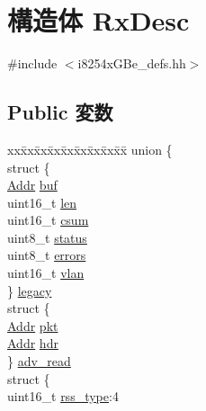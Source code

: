 \hypertarget{structiGbReg_1_1RxDesc}{
\section{構造体 RxDesc}
\label{structiGbReg_1_1RxDesc}
}


{\ttfamily \#include $<$i8254xGBe\_\-defs.hh$>$}\subsection*{Public 変数}
\begin{DoxyCompactItemize}
\item 
\begin{tabbing}
xx\=xx\=xx\=xx\=xx\=xx\=xx\=xx\=xx\=\kill
union \{\\
\>struct \{\\
\>\>\hyperlink{base_2types_8hh_af1bb03d6a4ee096394a6749f0a169232}{Addr} \hyperlink{structiGbReg_1_1RxDesc_ab07731c39d91dce80991730e3c50eba0}{buf}\\
\>\>uint16\_t \hyperlink{structiGbReg_1_1RxDesc_a8aed22e2c7b283705ec82e0120515618}{len}\\
\>\>uint16\_t \hyperlink{structiGbReg_1_1RxDesc_a70c414cecc404579f50124a9cebc66e9}{csum}\\
\>\>uint8\_t \hyperlink{structiGbReg_1_1RxDesc_ade818037fd6c985038ff29656089758d}{status}\\
\>\>uint8\_t \hyperlink{structiGbReg_1_1RxDesc_a6f3bf89addb0b7c567e6deb9813fd9b4}{errors}\\
\>\>uint16\_t \hyperlink{structiGbReg_1_1RxDesc_a92937e69e9229d22ff399ab3dc050fd2}{vlan}\\
\>\} \hyperlink{structiGbReg_1_1RxDesc_ab6262d7534baaa85f137d2a8c4acd25a}{legacy}\\
\>struct \{\\
\>\>\hyperlink{base_2types_8hh_af1bb03d6a4ee096394a6749f0a169232}{Addr} \hyperlink{structiGbReg_1_1RxDesc_afcf9928dfaed20e635236d24dbe63c94}{pkt}\\
\>\>\hyperlink{base_2types_8hh_af1bb03d6a4ee096394a6749f0a169232}{Addr} \hyperlink{structiGbReg_1_1RxDesc_abfa2f311aa605836fee9920f5997bb56}{hdr}\\
\>\} \hyperlink{structiGbReg_1_1RxDesc_adebf1737d6ac553e722db58b3cb5e966}{adv\_read}\\
\>struct \{\\
\>\>uint16\_t \hyperlink{structiGbReg_1_1RxDesc_a34dd3a620cd39dd7a33114c2418944c7}{rss\_type}:4\\

\end{tabbing}
\end{DoxyCompactItemize}

